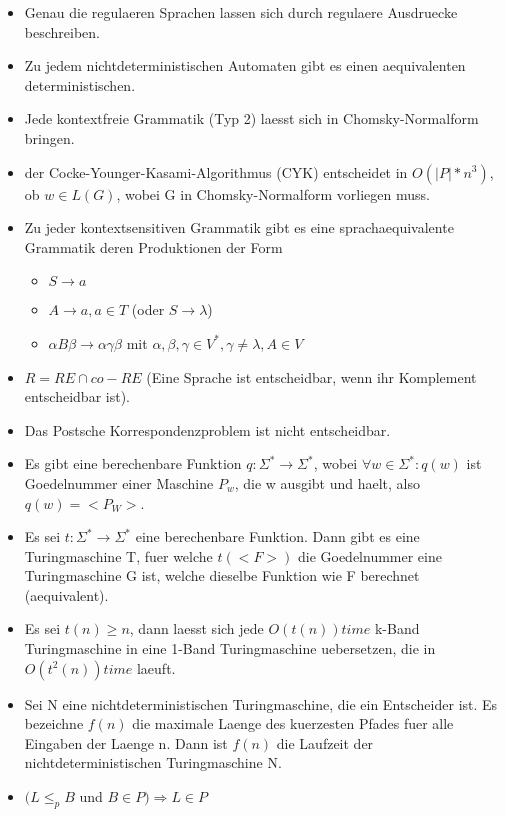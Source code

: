 \documentclass[a4paper]{scrreprt}
\begin{document}
\begin{itemize}
	\item Genau die regulaeren Sprachen lassen sich durch regulaere Ausdruecke beschreiben.
	\item Zu jedem nichtdeterministischen Automaten gibt es einen aequivalenten deterministischen.
	\item Jede kontextfreie Grammatik (Typ 2) laesst sich in Chomsky-Normalform bringen.
	\item der Cocke-Younger-Kasami-Algorithmus (CYK) entscheidet in $O(|P|*n^3)$, ob $w \in L(G)$, wobei G in Chomsky-Normalform vorliegen muss.
	\item Zu jeder kontextsensitiven Grammatik gibt es eine sprachaequivalente Grammatik deren Produktionen der Form
		\begin{itemize}
			\item $S \rightarrow a$
			\item $A \rightarrow a, a \in T$ (oder $S \rightarrow \lambda$)
			\item $\alpha B \beta \rightarrow \alpha\gamma\beta$ mit $\alpha,\beta,\gamma \in V^*,\gamma \neq \lambda, A \in V$
		\end{itemize}
	\item $R = RE \cap co-RE$ (Eine Sprache ist entscheidbar, wenn ihr Komplement entscheidbar ist).
	\item Das Postsche Korrespondenzproblem ist nicht entscheidbar.
	\item Es gibt eine berechenbare Funktion $q: \Sigma^* \rightarrow \Sigma^*$, wobei $\forall w \in \Sigma^*: q(w)$ ist Goedelnummer einer Maschine $P_w$, die w ausgibt und haelt, also $q(w) = <P_W>$.
	\item Es sei $t: \Sigma^* \rightarrow \Sigma^*$ eine berechenbare Funktion. Dann gibt es eine Turingmaschine T, fuer welche $t(<F>)$ die Goedelnummer eine Turingmaschine G ist, welche dieselbe Funktion wie F berechnet (aequivalent).
	\item Es sei $t(n) \ge n$, dann laesst sich jede $O(t(n)) time$ k-Band Turingmaschine in eine 1-Band Turingmaschine uebersetzen, die in $O(t^2(n)) time$ laeuft.
	\item Sei N eine nichtdeterministischen Turingmaschine, die ein Entscheider ist. Es bezeichne $f(n)$ die maximale Laenge des kuerzesten Pfades fuer alle Eingaben der Laenge n. Dann ist $f(n)$ die Laufzeit der nichtdeterministischen Turingmaschine N.
	\item $(L \le_p B$ und $B \in P) \Rightarrow L \in P$
\end{itemize}
\end{document}
